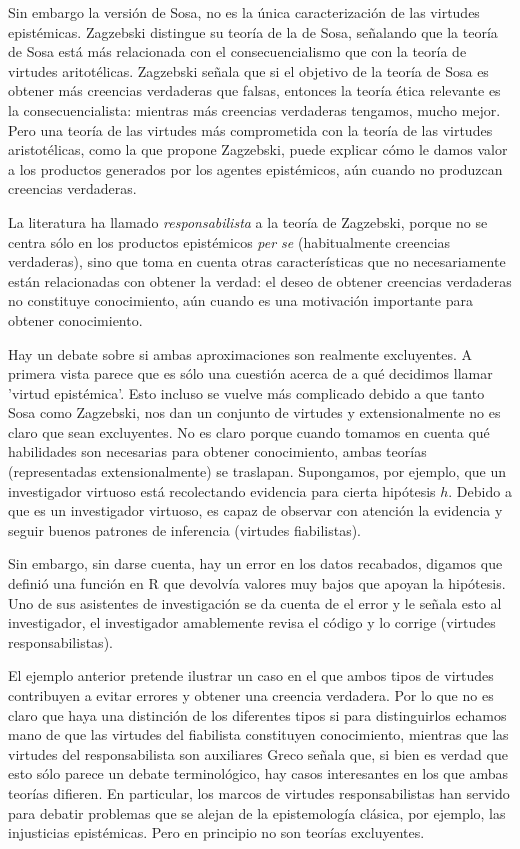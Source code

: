 Sin embargo la versión de Sosa, no es la única caracterización de las virtudes epistémicas. 
Zagzebski \parencite{zagzebski1996} distingue su teoría de la de Sosa, señalando que la teoría de Sosa está más relacionada con el consecuencialismo que con la teoría de virtudes aritotélicas.
Zagzebski señala que si el objetivo de la teoría de Sosa es obtener más creencias verdaderas que falsas, entonces la teoría ética relevante es la consecuencialista: mientras más creencias verdaderas tengamos, mucho mejor.
Pero una teoría de las virtudes más comprometida con la teoría de las virtudes aristotélicas, como la que propone Zagzebski, puede explicar cómo le damos valor a los productos generados por los agentes epistémicos, aún cuando no produzcan creencias verdaderas.

La literatura ha llamado \emph{responsabilista} a la teoría de Zagzebski, porque no se centra sólo en los productos epistémicos \textit{per se} (habitualmente creencias verdaderas), sino que toma en cuenta otras características que no necesariamente están relacionadas con obtener la verdad: el deseo de obtener creencias verdaderas no constituye conocimiento, aún cuando es una motivación importante para obtener conocimiento.

Hay un debate sobre si ambas aproximaciones son realmente excluyentes.
A primera vista parece que es sólo una cuestión acerca de a qué decidimos llamar 'virtud epistémica'.
Esto incluso se vuelve más complicado debido a que tanto Sosa como Zagzebski, nos dan un conjunto de virtudes y extensionalmente no es claro que sean excluyentes.
No es claro porque cuando tomamos en cuenta qué habilidades son necesarias para obtener conocimiento, ambas teorías (representadas extensionalmente) se traslapan.
Supongamos, por ejemplo, que un investigador virtuoso está recolectando evidencia para cierta hipótesis $h$.
Debido a que es un investigador virtuoso, es capaz de observar con atención la evidencia y seguir buenos patrones de inferencia (virtudes fiabilistas).

Sin embargo, sin darse cuenta, hay un error en los datos recabados, digamos que definió una función en R que devolvía valores muy bajos que apoyan la hipótesis. Uno de sus asistentes de investigación se da cuenta de el error y le señala esto al investigador, el investigador amablemente revisa el código y lo corrige (virtudes responsabilistas).

El ejemplo anterior pretende ilustrar un caso en el que ambos tipos de virtudes contribuyen a evitar errores y obtener una creencia verdadera.
Por lo que no es claro que haya una distinción de los diferentes tipos si para distinguirlos echamos mano de que las virtudes del fiabilista constituyen conocimiento, mientras que las virtudes del responsabilista son auxiliares \parencite[][p. 144]{sosa2017}
Greco \parencite{greco2002} señala que, si bien es verdad que esto sólo parece un debate terminológico, hay casos interesantes en los que ambas teorías difieren.
En particular, los marcos de virtudes responsabilistas han servido para debatir problemas que se alejan de la epistemología clásica, por ejemplo, las injusticias epistémicas.
Pero en principio no son teorías excluyentes.


